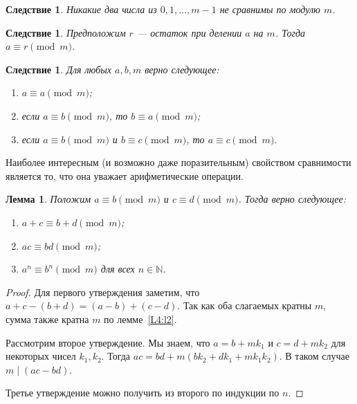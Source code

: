 \documentclass[12pt,notitlepage]{article}
\theoremstyle{plain}
\newtheorem{lemma}[thm]{Лемма}
\newtheorem{corr}[thm]{Следствие}
\theoremstyle{definition}
\theoremstyle{plain}
\newcommand{\N}{\mathbb{N}}
\newcommand{\1}{\mathbf{1}}
\newcommand{\0}{\mathbf{0}}
\newcommand{\dvd}{\mathop{\mid}}
\begin{document}
\begin{corr}\label{L4:c9}
	Никакие два числа из $0, 1,\ldots, m - 1$ не сравнимы по модулю $m$.
\end{corr}

\begin{corr}\label{L4:rem_congr}
	Предположим $r$ --- остаток при делении $a$ на $m$. Тогда $a \equiv r \pmod m$.
\end{corr}

\begin{corr}
	Для любых $a, b, m$ верно следующее:
	\begin{enumerate}
		\item $a \equiv a \pmod m$;
		\item если $a \equiv b \pmod m$, то $b \equiv a \pmod m$;
		\item если $a \equiv b \pmod m$ и $b \equiv c \pmod m$, то  $a \equiv c \pmod m$.
	\end{enumerate}
\end{corr}
Наиболее интересным (и возможно даже поразительным) свойством сравнимости является то, что она уважает арифметические операции.
\begin{lemma}\label{L4:l7}
	Положим $a \equiv b \pmod m$ и $c \equiv d \pmod m$. Тогда верно следующее:
	\begin{enumerate}
		\item $a + c \equiv b + d \pmod m$;
		\item $a c \equiv b  d \pmod m$;
		\item $a^n \equiv b^n \pmod m$ для всех $n \in \N$.
	\end{enumerate}
\end{lemma}
\begin{proof}
	Для первого утверждения заметим, что $a + c - (b + d) = (a - b) + (c - d)$. Так как оба слагаемых кратны $m$, сумма также кратна $m$ по лемме~\ref{L4:l2}.
	
	Рассмотрим второе утверждение. Мы знаем, что $a = b + mk_1$ и $c = d + mk_2$ для некоторых чисел $k_1, k_2$. Тогда $ac = bd + m(b k_2 + d k_1 + m k_1 k_2)$. В таком случае $m \dvd (ac - b d)$.
	
	Третье утверждение можно получить из второго по индукции по $n$.
\end{proof}
\end{document}
